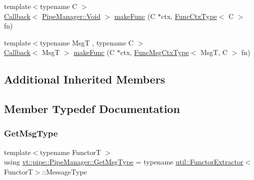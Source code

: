 \begin{DoxyCompactItemize}
\item 
{\footnotesize template$<$typename C $>$ }\\\hyperlink{namespacevt_a36db99df4c973d48b1118a293fff533f}{Callback}$<$ \hyperlink{structvt_1_1pipe_1_1_pipe_manager_ab720c2580ecfd3ab36e49aeaaff64cc6}{Pipe\+Manager\+::\+Void} $>$ \hyperlink{structvt_1_1pipe_1_1_pipe_manager_a64be0df0367ac73feff93acdd11f9a09}{make\+Func} (C $\ast$ctx, \hyperlink{structvt_1_1pipe_1_1_pipe_manager_base_ad8463823b6b4cfdb67c119d6d22e3bac}{Func\+Ctx\+Type}$<$ C $>$ fn)
\item 
{\footnotesize template$<$typename MsgT , typename C $>$ }\\\hyperlink{namespacevt_a36db99df4c973d48b1118a293fff533f}{Callback}$<$ MsgT $>$ \hyperlink{structvt_1_1pipe_1_1_pipe_manager_a92427d0fbe9ee05aff71178147814c96}{make\+Func} (C $\ast$ctx, \hyperlink{structvt_1_1pipe_1_1_pipe_manager_base_a73fdf82ece0411b3dc644c99b763f7a9}{Func\+Msg\+Ctx\+Type}$<$ MsgT, C $>$ fn)
\end{DoxyCompactItemize}
\subsection*{Additional Inherited Members}


\subsection{Member Typedef Documentation}
\mbox{\label{structvt_1_1pipe_1_1_pipe_manager_a221ce8bc0fc6639f43dad1e53a08c0d2}} 
\subsubsection{\texorpdfstring{Get\+Msg\+Type}{GetMsgType}}
{\footnotesize\ttfamily template$<$typename FunctorT $>$ \\
using \hyperlink{structvt_1_1pipe_1_1_pipe_manager_a221ce8bc0fc6639f43dad1e53a08c0d2}{vt\+::pipe\+::\+Pipe\+Manager\+::\+Get\+Msg\+Type} =  typename \hyperlink{structvt_1_1util_1_1_functor_extractor}{util\+::\+Functor\+Extractor}$<$FunctorT$>$\+::Message\+Type}

\mbox{\label{structvt_1_1pipe_1_1_pipe_manager_ab720c2580ecfd3ab36e49aeaaff64cc6}} 
